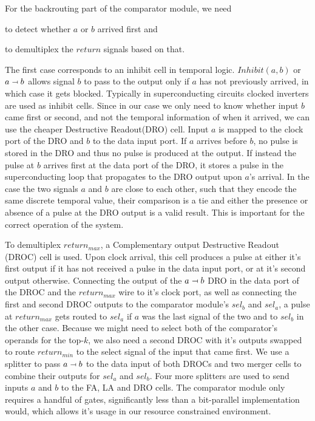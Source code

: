 \documentclass{article}
\newcommand{\inhib}{\relbar\mapsfromchar}
\begin{document}
For the backrouting part of the comparator module, we need
\begin{enumerate*}[label=\emph{\alph*})] \item to detect
    whether $a$ or $b$ arrived first and \item to
      demultiplex the $return$ signals based on that.
\end{enumerate*} The first case corresponds to an inhibit
cell in temporal logic. $Inhibit(a,b)$ or $a \inhib b$
allows signal $b$ to pass to the output only if $a$ has not
previously arrived, in which case it gets blocked. Typically
in superconducting circuits clocked inverters are used as
inhibit cells. Since in our case we only need to know
whether input $b$ came first or second, and not the temporal
information of when it arrived, we can use the cheaper
Destructive Readout(DRO) cell. Input $a$ is mapped to the
clock port of the DRO and $b$ to the data input port. If $a$
arrives before $b$, no pulse is stored in the DRO and thus
no pulse is produced at the output. If instead the pulse at
$b$ arrives first at the data port of the DRO, it stores a
pulse in the superconducting loop that propagates to the DRO
output upon $a$'s arrival. In the case the two signals $a$
and $b$ are close to each other, such that they encode the
same discrete temporal value, their comparison is a tie and
either the presence or absence of a pulse at the DRO output
is a valid result. This is important for the correct
operation of the system.

To demultiplex $return_{max}$, a Complementary output
Destructive Readout (DROC) cell is used. Upon clock arrival,
this cell produces a pulse at either it's first output if it
has not received a pulse in the data input port, or at it's
second output otherwise. Connecting the output of the $a
\inhib b$ DRO in the data port of the DROC and the
$return_{max}$ wire to it's clock port, as well as
connecting the first and second DROC outputs to the
comparator module's $sel_b$ and $sel_a$, a pulse at
$return_{max}$ gets routed to $sel_a$ if $a$ was the last
signal of the two and to $sel_b$ in the other case. Because
we might need to select both of the comparator's operands
for the top-$k$, we also need a second DROC with it's
outputs swapped to route $return_{min}$ to the select signal
of the input that came first. We use a splitter to pass $a
\inhib b$ to the data input of both DROCs and two merger
cells to combine their outputs for $sel_a$ and $sel_b$. Four
more splitters are used to send inputs $a$ and $b$ to the
FA, LA and DRO cells. The comparator module only requires a
handful of gates, significantly less than a bit-parallel
implementation would, which allows it's usage in our
resource constrained environment.
\end{document}
